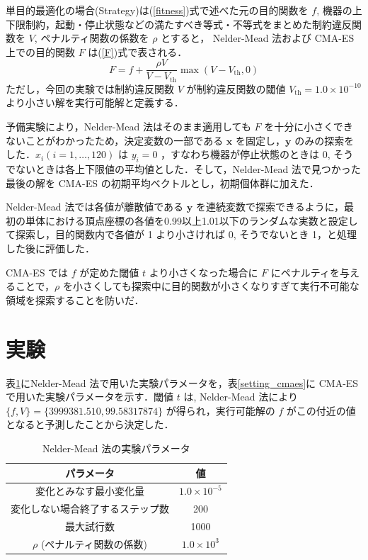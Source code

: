 \documentclass[twocolumn]{jarticle}
\begin{document}
単目的最適化の場合(Strategy)は(\ref{fitness})式で述べた元の目的関数を $f$, 機器の上下限制約，起動・停止状態などの満たすべき等式・不等式をまとめた制約違反関数を $V$, ペナルティ関数の係数を $\rho$ とすると， Nelder-Mead 法および CMA-ES 上での目的関数 $F$ は(\ref{F})式で表される．
\begin{equation}
    \label{F}
    F = f + \frac{\rho V}{V-V_\mathrm{th}}\max(V-V_\mathrm{th}, 0)
\end{equation}
ただし，今回の実験では制約違反関数 $V$ が制約違反関数の閾値 $V_\mathrm{th} = 1.0 \times 10^{-10}$ より小さい解を実行可能解と定義する．

予備実験により，Nelder-Mead 法はそのまま適用しても $F$ を十分に小さくできないことがわかったため，決定変数の一部である $\bm{x}$ を固定し，$\bm{y}$ のみの探索をした．$x_i(i=1,\dots,120)$ は $y_i=0$ ，すなわち機器が停止状態のときは 0, そうでないときは各上下限値の平均値とした．そして，Nelder-Mead 法で見つかった最後の解を CMA-ES の初期平均ベクトルとし，初期個体群に加えた．

Nelder-Mead 法では各値が離散値である $\bm{y}$ を連続変数で探索できるように，最初の単体における頂点座標の各値を0.99以上1.01以下のランダムな実数と設定して探索し，目的関数内で各値が 1 より小さければ 0, そうでないとき 1，と処理した後に評価した．

CMA-ES では $f$ が定めた閾値 $t$ より小さくなった場合に $F$ にペナルティを与えることで，$\rho$ を小さくしても探索中に目的関数が小さくなりすぎて実行不可能な領域を探索することを防いだ．

\section{実験}
表\ref{setting_nelder}にNelder-Mead 法で用いた実験パラメータを，表\ref{setting_cmaes}に CMA-ES で用いた実験パラメータを示す．閾値 $t$ は, Nelder-Mead 法により $\{f, V\}=\{3999381.510, 99.58317874\}$ が得られ，実行可能解の $f$ がこの付近の値となると予測したことから決定した．
\begin{table}[htbp]
    \begin{center}
        \caption{Nelder-Mead 法の実験パラメータ}
        \label{setting_nelder}
        \begin{tabular}{| c | c |} 
            \hline
            パラメータ & 値 \\ 
            \hline
            変化とみなす最小変化量 & $1.0\times10^{-5}$ \\
            変化しない場合終了するステップ数 & 200 \\
            最大試行数 & 1000 \\
            $\rho$ (ペナルティ関数の係数) & $1.0\times10^{3}$\\ 
            \hline
        \end{tabular}
    \end{center}
\end{table}
\end{document}
